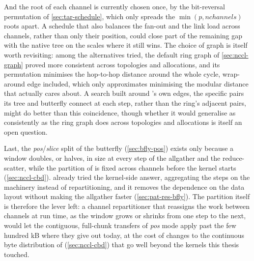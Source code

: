 And the root of each channel is currently chosen once, by the bit-reversal permutation of \cref{sec:tar-schedule}, which only spreads the $\min(p,\mathit{nchannels})$ roots apart. A schedule that also balances the fan-out and the link load across channels, rather than only their position, could close part of the remaining gap with the native tree on the scales where it still wins.
The choice of graph is itself worth revisiting: among the alternatives tried, the default ring graph of \cref{sec:nccl-graph} proved more consistent across topologies and allocations, and its permutation minimises the hop-to-hop distance around the whole cycle, wrap-around edge included, which only approximates minimising the modular distance that \bine{} actually cares about.
A search built around \bine{}'s own edges, the specific pairs its tree and butterfly connect at each step, rather than the ring's adjacent pairs, might do better than this coincidence, though whether it would generalise as consistently as the ring graph does across topologies and allocations is itself an open question.

Last, the \emph{pos}/\emph{slice} split of the butterfly (\cref{sec:bfly-pos}) exists only because a window doubles, or halves, in size at every step of the allgather and the reduce-scatter, while the partition of \nccl{} is fixed across channels before the kernel starts (\cref{sec:nccl-cbd}).
 already tried the kernel-side answer, aggregating the steps on the \pat{} machinery instead of repartitioning, and it removes the dependence on the data layout without making the allgather faster (\cref{sec:pat-res-bfly}).
The partition itself is therefore the lever left: a channel repartitioner that reassigns the work between channels at run time, as the window grows or shrinks from one step to the next, would let the contiguous, full-chunk transfers of \emph{pos} mode apply past the few hundred kB where they give out today, at the cost of changes to the continuous byte distribution of \nccl{} (\cref{sec:nccl-cbd}) that go well beyond the kernels this thesis touched.
